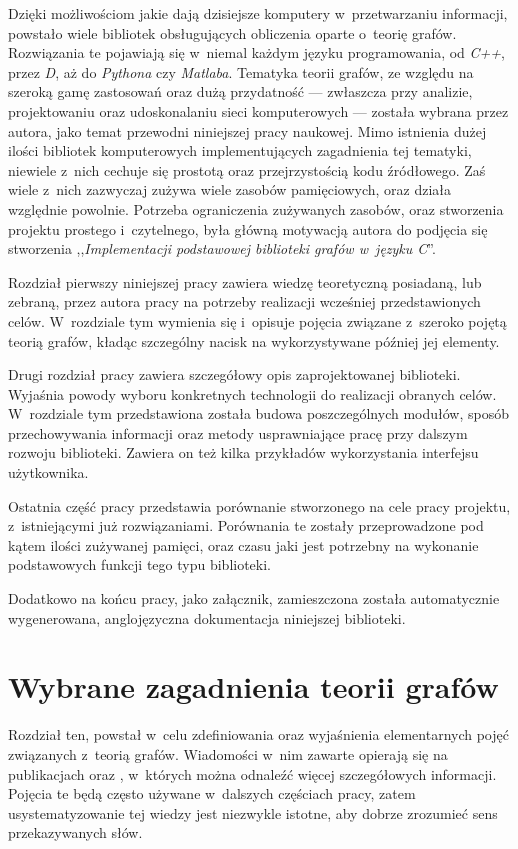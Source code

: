 \documentclass[a4paper,12pt,polish,oneside,openright]{thesis}
\begin{document}
Dzięki możliwościom jakie dają dzisiejsze komputery w~przetwarzaniu informacji, powstało wiele bibliotek obsługujących obliczenia oparte o~teorię grafów.
Rozwiązania te pojawiają się w~niemal każdym języku programowania, od \emph{C++}, przez \emph{D}, aż do \emph{Pythona} czy \emph{Matlaba}.
Tematyka teorii grafów, ze względu na szeroką gamę zastosowań oraz dużą przydatność --- zwłaszcza przy analizie, projektowaniu oraz udoskonalaniu sieci komputerowych --- została wybrana przez autora, jako temat przewodni niniejszej pracy naukowej.
Mimo istnienia dużej ilości bibliotek komputerowych implementujących zagadnienia tej tematyki, niewiele z~nich cechuje się prostotą oraz przejrzystością kodu źródłowego.
Zaś wiele z~nich zazwyczaj zużywa wiele zasobów pamięciowych, oraz działa względnie powolnie.
Potrzeba ograniczenia zużywanych zasobów, oraz stworzenia projektu prostego i~czytelnego, była główną motywacją autora do podjęcia się stworzenia ,,\emph{Implementacji podstawowej biblioteki grafów w~języku C}''.

Rozdział pierwszy niniejszej pracy zawiera wiedzę teoretyczną posiadaną, lub zebraną, przez autora pracy na potrzeby realizacji wcześniej przedstawionych celów.
W~rozdziale tym wymienia się i~opisuje pojęcia związane z~szeroko pojętą teorią grafów, kładąc szczególny nacisk na wykorzystywane później jej elementy.

Drugi rozdział pracy zawiera szczegółowy opis zaprojektowanej biblioteki.
Wyjaśnia powody wyboru konkretnych technologii do realizacji obranych celów.
W~rozdziale tym przedstawiona została budowa poszczególnych modułów, sposób przechowywania informacji oraz metody usprawniające pracę przy dalszym rozwoju biblioteki.
Zawiera on też kilka przykładów wykorzystania interfejsu użytkownika.

Ostatnia część pracy przedstawia porównanie stworzonego na cele pracy projektu, z~istniejącymi już rozwiązaniami.
Porównania te zostały przeprowadzone pod kątem ilości zużywanej pamięci, oraz czasu jaki jest potrzebny na wykonanie podstawowych funkcji tego typu biblioteki.

Dodatkowo na końcu pracy, jako załącznik, zamieszczona została automatycznie wygenerowana, anglojęzyczna dokumentacja niniejszej biblioteki.

\chapter{Wybrane zagadnienia teorii grafów}
Rozdział ten, powstał w~celu zdefiniowania oraz wyjaśnienia elementarnych pojęć związanych z~teorią grafów. Wiadomości w~nim zawarte opierają się na publikacjach \cite{graphtheory} oraz \cite{graphtheory2}, w~których można odnaleźć więcej szczegółowych informacji.
Pojęcia te będą często używane w~dalszych częściach pracy, zatem usystematyzowanie tej wiedzy jest niezwykle istotne, aby dobrze zrozumieć sens przekazywanych słów.
\end{document}

